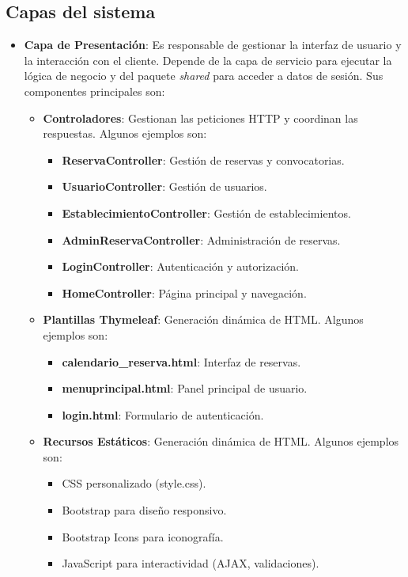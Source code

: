

\subsection{Capas del sistema}
\begin{itemize}
	\item \textbf{Capa de Presentación}: Es responsable de gestionar la interfaz de usuario y la interacción con el cliente. Depende de la capa de servicio para ejecutar la lógica de negocio y del paquete \emph{shared} para acceder a datos de sesión. Sus componentes principales son:
    	\begin{itemize}
            \item \textbf{Controladores}: Gestionan las peticiones HTTP y coordinan las respuestas. Algunos ejemplos son:
        	\begin{itemize}
                \item \textbf{ReservaController}: Gestión de reservas y convocatorias.
                \item \textbf{UsuarioController}: Gestión de usuarios.
                \item \textbf{EstablecimientoController}: Gestión de establecimientos.
                \item \textbf{AdminReservaController}: Administración de reservas.
                \item \textbf{LoginController}: Autenticación y autorización.
                \item \textbf{HomeController}: Página principal y navegación.
             \end{itemize}

            \item \textbf{Plantillas Thymeleaf}: Generación dinámica de HTML. Algunos ejemplos son:
            \begin{itemize}
               \item \textbf{calendario\_reserva.html}: Interfaz de reservas.
               \item \textbf{menuprincipal.html}: Panel principal de usuario.
               \item \textbf{login.html}: Formulario de autenticación.
            \end{itemize}

            \item \textbf{Recursos Estáticos}: Generación dinámica de HTML. Algunos ejemplos son:
            \begin{itemize}
               \item CSS personalizado (style.css).
               \item Bootstrap para diseño responsivo.
               \item Bootstrap Icons para iconografía.
               \item JavaScript para interactividad (AJAX, validaciones).
            \end{itemize}


\end{itemize}
\end{itemize}
